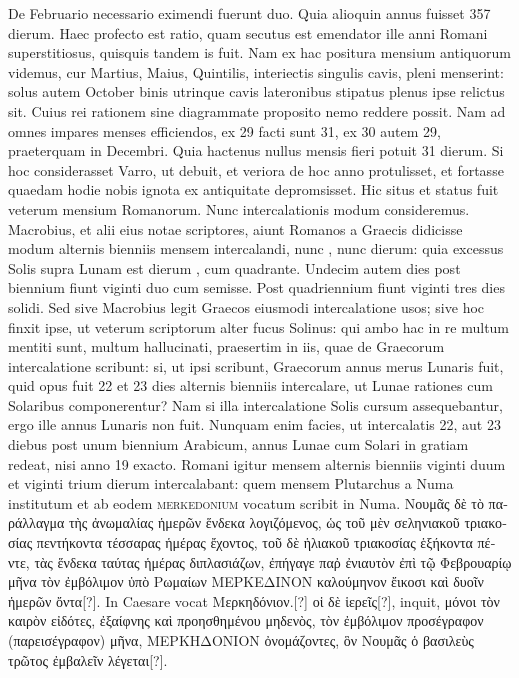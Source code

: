 De Februario
necessario eximendi fuerunt duo.
Quia alioquin annus fuisset
357 dierum.
Haec profecto est ratio, quam secutus est emendator
ille anni Romani superstitiosus, quisquis tandem is fuit.
Nam ex hac
positura mensium antiquorum videmus, cur Martius, Maius, Quintilis,
interiectis singulis cavis, pleni menserint: solus autem October
binis utrinque cavis lateronibus stipatus plenus ipse relictus sit.
Cuius rei rationem sine diagrammate proposito nemo reddere possit.
Nam ad omnes impares menses efficiendos, ex 29 facti sunt 31,
ex 30 autem 29, praeterquam in Decembri.
Quia hactenus nullus
mensis fieri potuit 31 dierum.
Si hoc considerasset Varro, ut debuit,
et veriora de hoc anno protulisset, et fortasse quaedam hodie nobis
ignota ex antiquitate depromsisset.
Hic situs et status fuit veterum
mensium Romanorum.
Nunc intercalationis modum consideremus.
Macrobius, et alii eius notae scriptores, aiunt Romanos a
Graecis didicisse modum alternis bienniis mensem intercalandi, nunc
, nunc  dierum: quia excessus Solis supra Lunam est
dierum , cum quadrante.
Undecim autem dies post biennium
fiunt viginti duo cum semisse.
Post quadriennium fiunt viginti tres
dies solidi.
Sed sive Macrobius legit Graecos eiusmodi intercalatione
usos; sive hoc finxit ipse, ut veterum scriptorum alter fucus Solinus:
qui ambo hac in re multum mentiti sunt, multum hallucinati,
praesertim in iis, quae de Graecorum intercalatione scribunt: si,
ut ipsi scribunt, Graecorum annus merus Lunaris fuit, quid opus fuit
22 et 23 dies alternis bienniis intercalare, ut Lunae rationes cum Solaribus
componerentur?
Nam si illa intercalatione Solis cursum
assequebantur, ergo ille annus Lunaris non fuit.
Nunquam enim
facies, ut intercalatis 22, aut 23 diebus post unum biennium Arabicum,
annus Lunae cum Solari in gratiam redeat, nisi anno 19 exacto.
Romani igitur mensem alternis bienniis viginti duum et viginti
trium dierum intercalabant: quem mensem Plutarchus a Numa
institutum et ab eodem \textsc{merkedonium} vocatum scribit in
Numa.
\textgreek{Νουμᾶς δὲ τὸ παράλλαγμα τὴς ἀνωμαλίας ἡμερῶν ἕνδεκα
 λογιζόμενος,
ὡς τοῦ μὲν σεληνιακοῦ τριακοσίας πεντήκοντα τέσσαρας ἡμέρας ἔχοντος, τοῦ δὲ
ἡλιακοῦ τριακοσίας ἑξήκοντα πέντε, τὰς ἕνδεκα ταύτας ἡμέρας διπλασιάζων,
 ἐπήγαγε
παῤ ἐνιαυτὸν ἐπὶ τῷ Φεβρουαρίῳ μῆνα τὸν ἐμβόλιμον ὑπὸ Ρωμαίων
ΜΕΡΚΕΔΙΝΟΝ καλούμηνον ἔικοσι καὶ δυοῖν ἡμερῶν ὄντα[?]}.
In Caesare vocat
\textgreek{Μερκηδόνιον.[?]}
\textgreek{οἱ δὲ ἱερεῖς[?]}, inquit, \textgreek{μόνοι τὸν καιρὸν εἰδότες,
 ἐξαίφνης
καὶ προησθημένου μηδενὸς, τὸν ἐμβόλιμον προσέγραφον (παρεισέγραφον)
μῆνα, ΜΕΡΚΗΔΟΝΙΟΝ ὀνομάζοντες, ὃν Νουμᾶς ὁ βασιλεὺς
τρῶτος ἐμβαλεῖν λέγεται[?]}.
